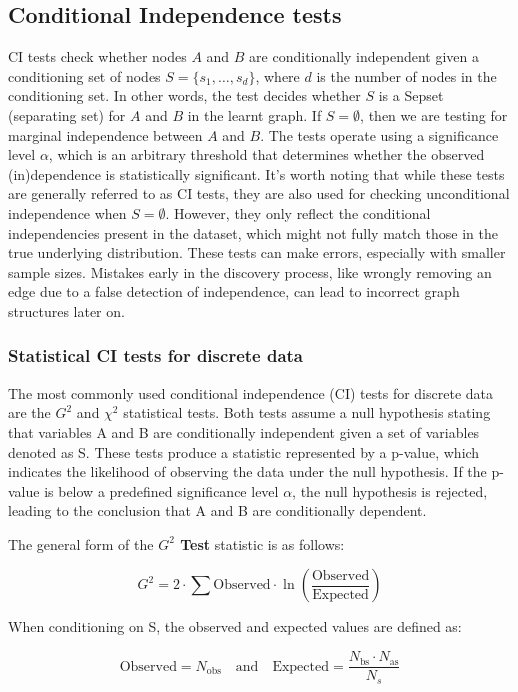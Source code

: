 \documentclass[main.tex]{subfiles}
\begin{document}
\subsection{Conditional Independence tests}
CI tests check whether nodes $A$ and $B$ are conditionally independent given a conditioning set of nodes $S = \{s_1, \dots, s_d\}$, where $d$ is the number of nodes in the conditioning set. In other words, the test decides whether $S$ is a Sepset (separating set) for $A$ and $B$ in the learnt graph. If $S = \emptyset$, then we are testing for marginal independence between $A$ and $B$. The tests operate using a significance level $\alpha$, which is an arbitrary threshold that determines whether the observed (in)dependence is statistically significant. It's worth noting that while these tests are generally referred to as CI tests, they are also used for checking unconditional independence when $S = \emptyset$. However, they only reflect the conditional independencies present in the dataset, which might not fully match those in the true underlying distribution. These tests can make errors, especially with smaller sample sizes. Mistakes early in the discovery process, like wrongly removing an edge due to a false detection of independence, can lead to incorrect graph structures later on. 
\subsubsection*{Statistical CI tests for discrete data}
The most commonly used conditional independence (CI) tests for discrete data are the $ G^2 $ and $ \chi^2 $ statistical tests. Both tests assume a null hypothesis stating that variables A and B are conditionally independent given a set of variables denoted as S. These tests produce a statistic represented by a p-value, which indicates the likelihood of observing the data under the null hypothesis. If the p-value is below a predefined significance level $ \alpha $, the null hypothesis is rejected, leading to the conclusion that A and B are conditionally dependent.

The general form of the \textbf{$ G^2 $ Test} statistic is as follows:

\[
G^2 = 2 \cdot \sum \text{Observed} \cdot \ln \left( \frac{\text{Observed}}{\text{Expected}} \right)
\]

When conditioning on S, the observed and expected values are defined as:

\[
\text{Observed} = N_{\text{obs}} \quad \text{and} \quad \text{Expected} = \frac{N_{\text{bs}} \cdot N_{\text{as}}}{N_s}
\]
\end{document}
